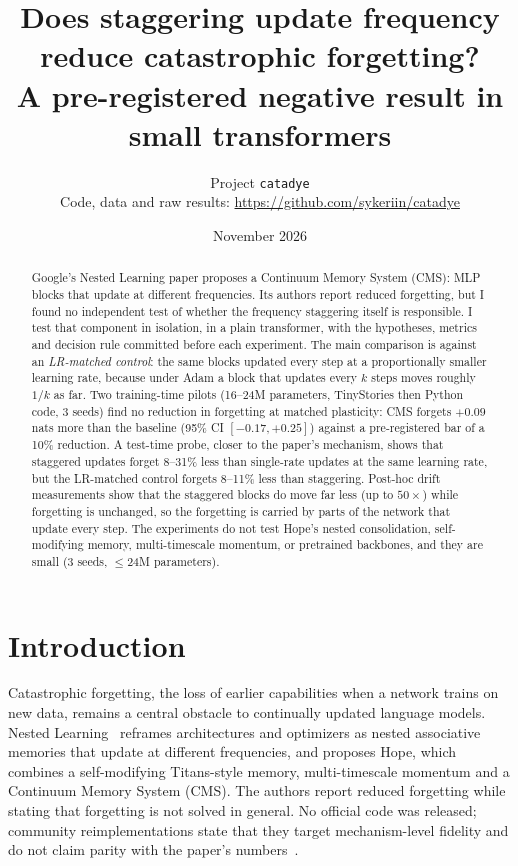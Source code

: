 \documentclass[10pt]{article}
\title{Does staggering update frequency reduce catastrophic forgetting?\\
\large A pre-registered negative result in small transformers}
\author{Project \texttt{catadye}\\ \small Code, data and raw results: \url{https://github.com/sykeriin/catadye}}
\date{November 2026}
\begin{document}
\maketitle

\begin{abstract}
Google's Nested Learning paper proposes a Continuum Memory System (CMS): MLP blocks that update at different
frequencies. Its authors report reduced forgetting, but I found no independent test of whether the frequency
staggering itself is responsible. I test that component in isolation, in a plain transformer, with the hypotheses,
metrics and decision rule committed before each experiment. The main comparison is against an \emph{LR-matched
control}: the same blocks updated every step at a proportionally smaller learning rate, because under Adam a block that updates
every $k$ steps moves roughly $1/k$ as far. Two training-time pilots (16--24M parameters, TinyStories then Python
code, 3 seeds) find no reduction in forgetting at matched plasticity: CMS forgets $+0.09$ nats more than the baseline
(95\% CI $[-0.17,+0.25]$) against a pre-registered bar of a 10\% reduction. A test-time probe, closer to the paper's mechanism,
shows that staggered updates forget 8--31\% less than single-rate updates at the same learning rate, but the LR-matched control forgets
8--11\% less than staggering. Post-hoc drift measurements show that the staggered blocks do move far less (up to $50\times$)
while forgetting is unchanged, so the forgetting is carried by parts of the network that update every step. The
experiments do not test Hope's nested consolidation, self-modifying memory, multi-timescale momentum, or
pretrained backbones, and they are small (3 seeds, $\leq$24M parameters).
\end{abstract}

\section{Introduction}
Catastrophic forgetting, the loss of earlier capabilities when a network trains on new data, remains a central obstacle to
continually updated language models. Nested Learning~\cite{nl} reframes architectures and optimizers as nested
associative memories that update at different frequencies, and proposes Hope, which combines a self-modifying Titans-style
memory, multi-timescale momentum and a Continuum Memory System (CMS). The authors report reduced forgetting while stating that
forgetting is not solved in general. No official code was released; community reimplementations state that they target
mechanism-level fidelity and do not claim parity with the paper's numbers~\cite{kmccleary}.
\end{document}
